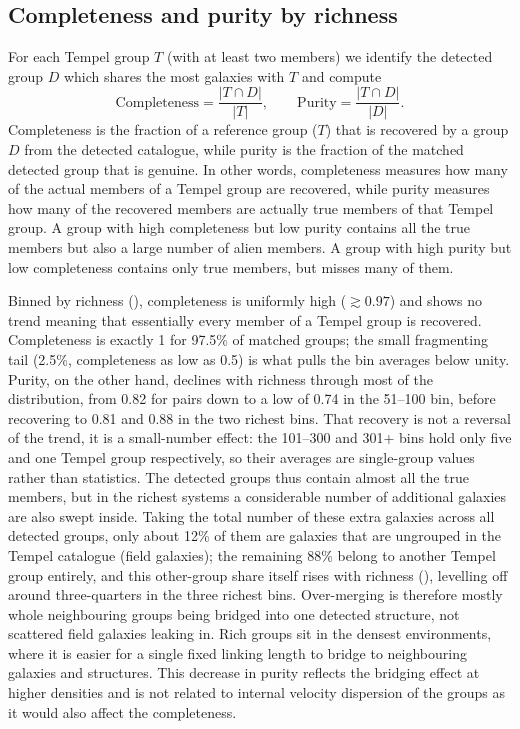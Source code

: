 \documentclass[9pt,a4paper,twocolumn,twoside]{rho-class/rho}
\begin{document}
\subsection{Completeness and purity by richness}
For each Tempel group $T$ (with at least two members) we
identify the detected group $D$ which shares the most galaxies with $T$ and
compute
\begin{equation}\label{eq:cp}
    \mathrm{Completeness} = \frac{|T \cap D|}{|T|}, \qquad
    \mathrm{Purity} = \frac{|T \cap D|}{|D|}.
\end{equation}
Completeness is the fraction of a reference group ($T$) that is
recovered by a group $D$ from the detected catalogue, while purity is the
fraction of the matched detected group that is genuine.
In other words, completeness measures how many of the actual members of a Tempel group
are recovered, while purity measures how many of
the recovered members are actually true members of that Tempel group. A group
with high completeness but low purity contains all the
true members but also a large number of alien members. A group with high purity
but low completeness contains only true members, but misses many of them.

Binned by richness (), completeness is uniformly high
($\gtrsim 0.97$) and shows no trend meaning that essentially every member of a Tempel group
is recovered. Completeness is exactly 1 for 97.5\% of matched groups; the
small fragmenting tail (2.5\%, completeness as low as 0.5) is what pulls
the bin averages below unity. Purity, on the other hand, declines with richness through most of
the distribution, from 0.82 for pairs down to a low of 0.74 in the 51--100 bin, before recovering
to 0.81 and 0.88 in the two richest bins. That recovery is not a reversal of the trend, it is a
small-number effect: the 101--300 and 301+ bins hold only five and one Tempel group respectively,
so their averages are single-group values rather than statistics. The detected groups thus contain almost all the true
members, but in the richest systems a considerable number of additional galaxies are also
swept inside. Taking the total number of these extra galaxies across all detected groups, only about 12\%
of them are galaxies that are ungrouped in the Tempel catalogue (field galaxies); the remaining 88\% belong to
another Tempel group entirely, and this other-group share itself rises with richness (),
levelling off around three-quarters in the three richest bins. Over-merging is therefore mostly whole neighbouring groups being
bridged into one detected structure, not scattered field galaxies leaking in.
Rich groups sit in the densest environments, where it is easier for a single fixed linking length to
bridge to neighbouring galaxies and structures. This decrease in purity reflects
the bridging effect at higher densities and is not related to internal velocity dispersion of the groups as it would
also affect the completeness.
\end{document}
